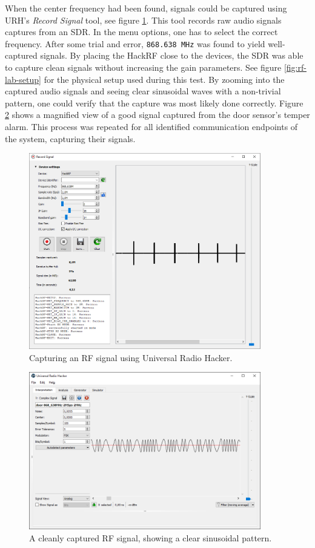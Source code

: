 When the center frequency had been found, signals could be captured using URH's \textit{Record Signal} tool, see figure \ref{fig:rf-signal-capture}. This tool records raw audio signals captures from an SDR. In the menu options, one has to select the correct frequency. After some trial and error, \texttt{868.638 MHz} was found to yield well-captured signals. By placing the HackRF close to the devices, the SDR was able to capture clean signals without increasing the gain parameters. See figure \ref{fig:rf-lab-setup} for the physical setup used during this test. By zooming into the captured audio signals and seeing clear sinusoidal waves with a non-trivial pattern, one could verify that the capture was most likely done correctly. Figure \ref{fig:zoomed-in-signal} shows a magnified view of a good signal captured from the door sensor's temper alarm. This process was repeated for all identified communication endpoints of the system, capturing their signals.
\begin{figure}[!ht]
    \centering
    \includegraphics[width=0.9\textwidth]{images/6-pentesting/signal-capture.png}
    \caption{Capturing an RF signal using Universal Radio Hacker.}
    \label{fig:rf-signal-capture}
\end{figure}
\begin{figure}[!ht]
    \centering
    \includegraphics[width=0.9\textwidth]{images/6-pentesting/zoomed-in-signal.png}
    \caption{A cleanly captured RF signal, showing a clear sinusoidal pattern.}
    \label{fig:zoomed-in-signal}
\end{figure}

